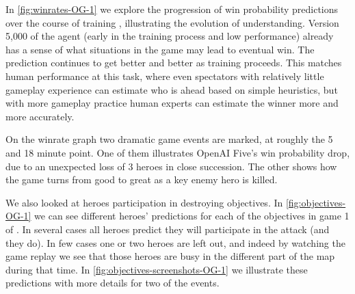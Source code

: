 \documentclass[ocean-paper.tex]{subfiles}
\begin{document}
In \autoref{fig:winrates-OG-1} we explore the progression of win probability predictions over the course of training \cleanexpname, illustrating the evolution of understanding. %
Version 5,000 of the agent (early in the training process and low performance) already has a sense of what situations in the game may lead to eventual win. 
The prediction continues to get better and better as training proceeds.
This matches human performance at this task, where even spectators with relatively little gameplay experience can estimate who is ahead based on simple heuristics, but with more gameplay practice human experts can estimate the winner more and more accurately.

On the winrate graph two dramatic game events are marked, at roughly the 5 and 18 minute point.
One of them illustrates OpenAI Five's win probability drop, due to an unexpected loss of 3 heroes in close succession.
The other shows how the game turns from good to great as a key enemy hero is killed.

We also looked at heroes participation in destroying objectives.
In \autoref{fig:objectives-OG-1} we can see different heroes' predictions for each of the objectives in game 1 of \openaifinals.
In several cases all heroes predict they will participate in the attack (and they do).
In few cases one or two heroes are left out, and indeed by watching the game replay we see that those heroes are busy in the different part of the map during that time.
In \autoref{fig:objectives-screenshots-OG-1} we illustrate these predictions with more details for two of the events.
\end{document}
